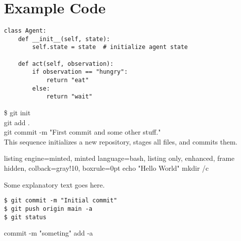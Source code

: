 
\chapter*{Example Code}
\vspace{1em} %


\begin{lstlisting}[style=python-clean, caption={Example Python code}]
class Agent:
    def __init__(self, state):
        self.state = state  # initialize agent state

    def act(self, observation):
        if observation == "hungry":
            return "eat"
        else:
            return "wait"
\end{lstlisting}


\begin{tcolorbox}[splitBox, listing engine=minted]
\$ git init\\
git add .\\
git commit -m "First commit and some other stuff."\\
\tcblower
This sequence initializes a new repository, stages all files, and commits them.
\end{tcolorbox}

\begin{tcolorbox}[splitBoxCode, title=Example]

\begin{tcblisting}{
    listing engine=minted,
    minted language=bash,
    listing only,
    enhanced,
    frame hidden,
    colback=gray!10,
    boxrule=0pt
}
echo "Hello World"
mkdir /c
\end{tcblisting}

\tcblower
Some explanatory text goes here.
\end{tcolorbox}

\begin{lstlisting}
$ git commit -m "Initial commit"
$ git push origin main -a
$ git status
\end{lstlisting}

\begin{gitBashBox}
commit -m "someting"
add -a
\end{gitBashBox}